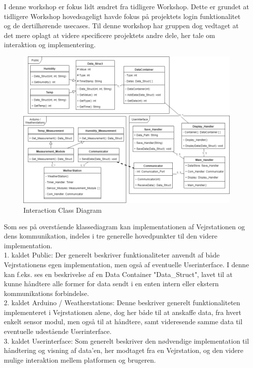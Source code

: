 \noindent
I denne workshop er fokus lidt ændret fra tidligere Workshop. Dette er grundet at tidligere Workshop hovedsageligt havde fokus på projektets login funktionalitet og de dertilhørende usecases. Til denne workshop har gruppen dog vedtaget at det mere oplagt at videre specificere projektets andre dele, her tale om interaktion og implementering.

\begin{figure}[H]
    \centering
    \includegraphics[width=1\textwidth, angle =0]{Struktureret_System_Udvikling/Workshop_2/Assets/Workshop2_ClassDiagram.png}
    \caption{Interaction Class Diagram}
    \label{fig:my_label}
\end{figure}

\noindent
Som ses på overstående klassediagram kan implementationen af Vejrstationen og dens kommunikation, indeles i tre generelle hovedpunkter til den videre implementation.\\
1. kaldet Public:
Der generelt beskriver funktionaliteter anvendt af både Vejrstationens egen implementation, men også af eventuelle Userinterface.
I denne kan f.eks. ses en beskrivelse af en Data Container "Data\_Struct", lavet til at kunne håndtere alle former for data sendt i en enten intern eller ekstern kommunikations forbindelse.\\
2. kaldet Arduino / Weatherstations:
Denne beskriver generelt funktionaliteten implementeret i Vejrstationen alene, dog her både til at anskaffe data, fra hvert enkelt sensor modul, men også til at håndtere, samt videresende samme data til eventuelle udestående Userinterface.\\
3. kaldet Userinterface:
Som generelt beskriver den nødvendige implementation til håndtering og visning af data'en, her modtaget fra en Vejrstation, og den videre mulige interaktion mellem platformen og brugeren.

